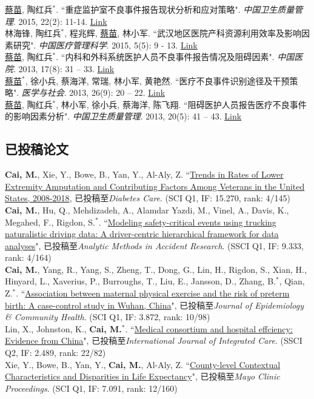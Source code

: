 \documentclass[11pt, a4paper]{article}
\newcommand{\years}[1]{\marginnote{\scriptsize #1}}
\begin{document}
\years{2015}\underline{蔡苗}, 陶红兵$^\ast$. ``重症监护室不良事件报告现状分析和应对策略". \emph{中国卫生质量管理}. 2015, 22(2): 11-14. \href{http://www.cnki.com.cn/Article/CJFDTOTAL-WSJG201502008.htm}{Link}\\[6pt]
\years{2015} 林海锋, 陶红兵$^\ast$, 程兆辉, \underline{蔡苗}, 林小军. ``武汉地区医院产科资源利用效率及影响因素研究". \emph{中国医疗管理科学}. 2015, 5(5): 9 - 13. \href{http://www.cnki.com.cn/Article/CJFDTOTAL-YLGL201505004.htm}{Link}\\[6pt]
\years{2013}\underline{蔡苗}, 陶红兵$^\ast$. ``内科和外科系统医护人员不良事件报告情况及阻碍因素". \emph{中国医院}. 2013, 17(8): 31 – 33. \href{http://www.cnki.com.cn/Article/CJFDTOTAL-ZGYU201308016.htm}{Link}\\[6pt]
\years{2013}\underline{蔡苗}$^\ast$,  徐小兵, 蔡海洋, 常瑞, 林小军, 黄艳然. ``医疗不良事件识别途径及干预策略". \emph{医学与社会}. 2013, 26(9): 20 – 22. \href{http://www.cnki.com.cn/Article/CJFDTOTAL-YXSH201309007.htm}{Link}\\[6pt]
\years{2013}\underline{蔡苗}, 陶红兵$^\ast$, 林小军, 徐小兵, 蔡海洋, 陈飞翔. ``阻碍医护人员报告医疗不良事件的影响因素分析". \emph{中国卫生质量管理}. 2013, 20(5): 41 – 43. \href{http://www.cqvip.com/qk/98273x/201305/47221843.html}{Link}

\subsection*{已投稿论文}
\noindent
\years{2019}\textbf{Cai, M.}, Xie, Y., Bowe, B., Yan, Y., Al-Aly, Z. ``\ul{Trends in Rates of Lower Extremity Amputation and Contributing Factors Among Veterans in the United States, 2008-2018}, 已投稿至\emph{Diabetes Care}. (SCI Q1, IF: 15.270, rank: 4/145)\\[6pt]
\years{2020}\textbf{Cai, M.}, Hu, Q., Mehdizadeh, A., Alamdar Yazdi, M., Vinel, A., Davis, K., Megahed, F., Rigdon, S.$^\ast$. ``\ul{Modeling safety-critical events using trucking naturalistic driving data: A driver-centric hierarchical framework for data analyses}", 已投稿至\emph{Analytic Methods in Accident Research}. (SSCI Q1, IF: 9.333, rank: 4/164)\\[6pt]
\years{2020}\textbf{Cai, M.}, Yang, R., Yang, S., Zheng, T., Dong, G., Lin, H., Rigdon, S., Xian, H., Hinyard, L., Xaverius, P., Burroughs, T., Liu, E., Jansson, D., Zhang, B.$^\ast$, Qian, Z.$^\ast$. ``\ul{Association between maternal physical exercise and the risk of preterm birth: A case-control study in Wuhan, China}", 已投稿至\emph{Journal of Epidemiology \& Community Health}. (SCI Q1, IF: 3.872, rank: 10/98)\\[6pt]
\years{2020}Lin, X., Johnston, K., \textbf{Cai, M.$^*$}. ``\ul{Medical consortium and hospital effciency: Evidence from China}", 已投稿至\emph{International Journal of Integrated Care}. (SSCI Q2, IF: 2.489, rank: 22/82)\\[6pt]
\years{2019}Xie, Y., Bowe, B., Yan, Y., \textbf{Cai, M.}, Al-Aly, Z. ``\ul{County-level Contextual Characteristics and Disparities in Life Expectancy}", 已投稿至\emph{Mayo Clinic Proceedings}. (SCI Q1, IF: 7.091, rank: 12/160)
\end{document}
